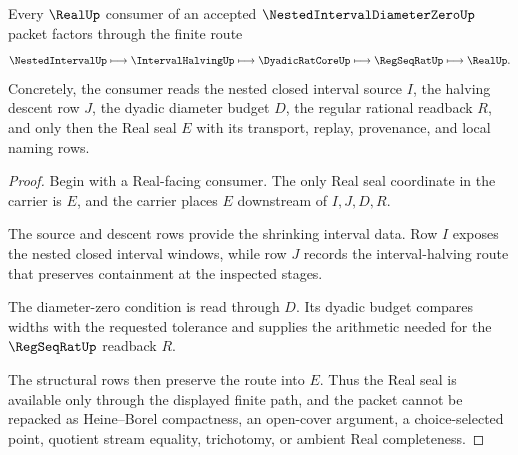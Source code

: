 \begin{theorem}
\label{thm:nested-interval-diameter-zero-real-seal}
Every $\RealUp$ consumer of an accepted $\NestedIntervalDiameterZeroUp$ packet factors through the finite route
$$
\NestedIntervalUp \longmapsto \IntervalHalvingUp \longmapsto \DyadicRatCoreUp \longmapsto \RegSeqRatUp \longmapsto \RealUp .
$$
Concretely, the consumer reads the nested closed interval source $I$, the halving descent row $J$, the dyadic diameter budget $D$, the regular rational readback $R$, and only then the Real seal $E$ with its transport, replay, provenance, and local naming rows.
\end{theorem}
\begin{proof}
Begin with a Real-facing consumer. The only Real seal coordinate in the carrier is $E$, and the carrier places $E$ downstream of $I,J,D,R$.

The source and descent rows provide the shrinking interval data. Row $I$ exposes the nested closed interval windows, while row $J$ records the interval-halving route that preserves containment at the inspected stages.

The diameter-zero condition is read through $D$. Its dyadic budget compares widths with the requested tolerance and supplies the arithmetic needed for the $\RegSeqRatUp$ readback $R$.

The structural rows then preserve the route into $E$. Thus the Real seal is available only through the displayed finite path, and the packet cannot be repacked as Heine--Borel compactness, an open-cover argument, a choice-selected point, quotient stream equality, trichotomy, or ambient Real completeness.
\end{proof}



